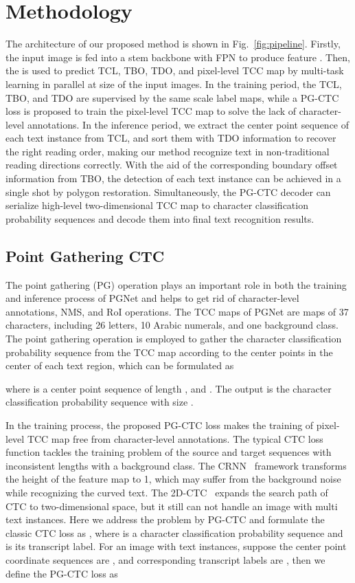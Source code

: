 \documentclass[letterpaper]{article} \usepackage{aaai21}  \usepackage{times}  \usepackage{helvet} \usepackage{courier}  \usepackage[hyphens]{url}  \usepackage{graphicx} \urlstyle{rm} \def\UrlFont{\rm}  \usepackage{natbib}  \usepackage{caption} \usepackage{bm}
\begin{document}
\section{Methodology}
The architecture of our proposed method is shown in Fig.~\ref{fig:pipeline}. Firstly, the input image is fed into a stem backbone with FPN to produce feature . Then, the  is used to predict TCL, TBO, TDO, and pixel-level TCC map by multi-task learning in parallel at  size of the input images. In the training period, the TCL, TBO, and TDO are supervised by the same scale label maps, while a PG-CTC loss is proposed to train the pixel-level TCC map to solve the lack of character-level annotations. In the inference period, we extract the center point sequence of each text instance from TCL, and sort them with TDO information to recover the right reading order, making our method recognize text in non-traditional reading directions correctly.
With the aid of the corresponding boundary offset information from TBO, the detection of each text instance can be achieved in a single shot by polygon restoration. Simultaneously, the PG-CTC decoder can serialize high-level two-dimensional TCC map to character classification probability sequences and decode them into final text recognition results.

\subsection{Point Gathering CTC}
\label{sect_PG}
The point gathering (PG) operation plays an important role in both the training and inference process of PGNet and helps to get rid of character-level annotations, NMS, and RoI operations. The TCC maps of PGNet are maps of 37 characters, including 26 letters, 10 Arabic numerals, and one background class. The point gathering operation is employed to gather the character classification probability sequence from the TCC map according to the center points in the center of each text region, which can be formulated as

where  is a center point sequence of length , and .  The output  is the character classification probability sequence with size .

In the training process, the proposed PG-CTC loss makes the training of pixel-level TCC map free from character-level annotations. The typical CTC loss function tackles the training problem of the source and target sequences with inconsistent lengths with a background class. The CRNN~\cite{shi2017crnn} framework transforms the height of the feature map to 1, which may suffer from the background noise while recognizing the curved text. The 2D-CTC~\cite{wan20192dctc} expands the search path of CTC to two-dimensional space, but it still can not handle an image with multi text instances. Here we address the problem by PG-CTC and formulate the classic CTC loss as , where  is a character classification probability sequence and  is its transcript label. For an image with  text instances, suppose the center point coordinate sequences are , and corresponding transcript labels are , then we define the PG-CTC loss as
\end{document}
